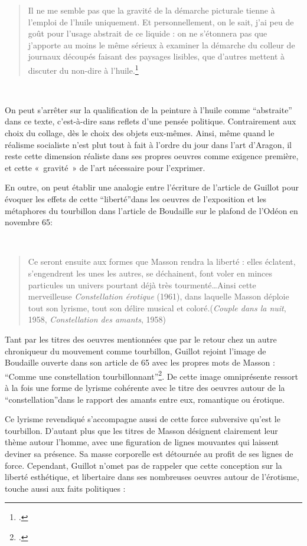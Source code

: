 \begin{quote}
Il ne me semble pas que la gravité de la démarche picturale tienne à l’emploi de l’huile uniquement. Et personnellement, on le sait, j’ai peu de goût pour l’usage abstrait de ce liquide : on ne s’étonnera pas que j’apporte au moins le même sérieux à examiner la démarche du colleur de journaux découpés faisant des paysages lisibles, que d’autres mettent à discuter du non-dire à l’huile.\footcite{hoffmeister}\end{quote}
 

	 On peut s’arrêter sur la qualification de la peinture à l’huile comme \enquote{abstraite} dans ce texte, c’est-à-dire sans reflets d’une pensée politique. Contrairement aux choix du collage, dès le choix des objets eux-mêmes. Ainsi, même quand le réalisme socialiste n’est plut tout à fait à l’ordre du jour dans l’art d’Aragon, il reste cette dimension réaliste dans ses propres oeuvres comme exigence première, et cette « gravité » de l’art nécessaire pour l’exprimer.

En outre, on peut établir une analogie entre l’écriture de l’article de Guillot pour évoquer les effets de cette \enquote{liberté}dans les oeuvres de l’exposition et les métaphores du tourbillon dans l’article de Boudaille sur le plafond de l’Odéon en novembre 65: 

 \begin{quote}
Ce seront ensuite aux formes que Masson rendra la liberté : elles éclatent, s’engendrent les unes les autres, se déchainent, font voler en minces particules un univers pourtant déjà très tourmenté…Ainsi cette merveilleuse \emph{Constellation érotique} (1961), dans laquelle Masson déploie tout son lyrisme, tout son délire musical et coloré.(\emph{Couple dans la nuit}, 1958, \emph{Constellation des amants}, 1958)	
\end{quote}


	Tant par les titres des oeuvres mentionnées que par le retour chez un autre chroniqueur du mouvement comme tourbillon, Guillot rejoint l’image de Boudaille ouverte dans son article de 65 avec les propres mots de Masson : \enquote{Comme une constellation tourbillonnant}\footcite{avantinauguration}. De cette image omniprésente ressort à la fois une forme de lyrisme cohérente avec le titre des oeuvres autour de la \enquote{constellation}dans le rapport des amants entre eux, romantique ou érotique. 

Ce lyrisme revendiqué s’accompagne aussi de cette force subversive qu’est le tourbillon. D’autant plus que les titres de Masson désignent clairement leur thème autour l’homme, avec une figuration de lignes mouvantes qui laissent deviner sa présence. Sa masse corporelle est détournée au profit de ses lignes de force. Cependant, Guillot n’omet pas de rappeler que cette conception sur la liberté esthétique, et libertaire dans ses nombreuses oeuvres autour de l’érotisme, touche aussi aux faits politiques : 

